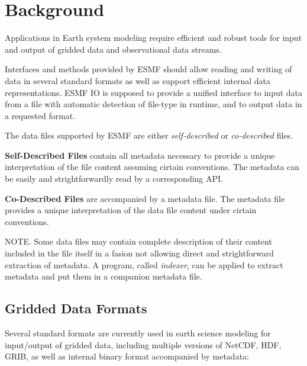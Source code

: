 
\section{Background}

Applications in Earth system modeling require efficient and robust
tools for input and output of gridded data and observational data streams.

Interfaces and methods provided by ESMF should allow reading and
writing of data in several standard formats as well as support
efficient internal data representations. ESMF IO is supposed to
provide a unified interface to input data from a file with automatic 
detection of file-type in runtime, and to output data in a requested format.

The data files  supported by ESMF are either {\em self-described} or
{\em co-described} files.


{\bf Self-Described Files} contain all metadata
necessary to provide a unique interpretation of the file content
assuming cirtain conventions. The metadata can be easily and
strightforwardly read by a corresponding API.

{\bf Co-Described Files} are accompanied by a metadata file. The
metadata file provides a unique interpretation of the data file content
under cirtain conventions. 


NOTE. Some data files may contain complete description of their
content included in the file itself in a fasion not allowing direct
and strightforward extraction of metadata. A program, called {\em
indexer}, can be applied to extract metadata and put them in a
companion metadata file.


\subsection{Gridded Data Formats}

Several standard formats are currently used in earth science modeling
for input/output of gridded data, including multiple versions of
NetCDF, HDF, GRIB, as well as internal binary format accompanied by
metadata:


